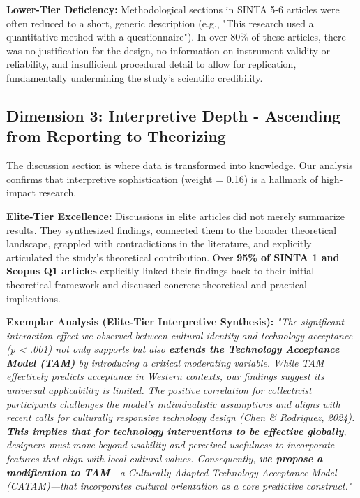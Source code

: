 \documentclass[journal,article,submit,pdftex,moreauthors]{Definitions/mdpi}
\begin{document}
\textbf{Lower-Tier Deficiency:} Methodological sections in SINTA 5-6 articles were often reduced to a short, generic description (e.g., "This research used a quantitative method with a questionnaire"). In over 80\% of these articles, there was no justification for the design, no information on instrument validity or reliability, and insufficient procedural detail to allow for replication, fundamentally undermining the study's scientific credibility.

\subsection{Dimension 3: Interpretive Depth - Ascending from Reporting to Theorizing}

The discussion section is where data is transformed into knowledge. Our analysis confirms that interpretive sophistication (weight = 0.16) is a hallmark of high-impact research.

\textbf{Elite-Tier Excellence:} Discussions in elite articles did not merely summarize results. They synthesized findings, connected them to the broader theoretical landscape, grappled with contradictions in the literature, and explicitly articulated the study's theoretical contribution. Over \textbf{95\% of SINTA 1 and Scopus Q1 articles} explicitly linked their findings back to their initial theoretical framework and discussed concrete theoretical and practical implications.

\textbf{Exemplar Analysis (Elite-Tier Interpretive Synthesis):}
\textit{"The significant interaction effect we observed between cultural identity and technology acceptance (p < .001) not only supports but also \textbf{extends the Technology Acceptance Model (TAM)} by introducing a critical moderating variable. While TAM effectively predicts acceptance in Western contexts, our findings suggest its universal applicability is limited. The positive correlation for collectivist participants challenges the model's individualistic assumptions and aligns with recent calls for culturally responsive technology design (Chen \& Rodriguez, 2024). \textbf{This implies that for technology interventions to be effective globally}, designers must move beyond usability and perceived usefulness to incorporate features that align with local cultural values. Consequently, \textbf{we propose a modification to TAM}—a Culturally Adapted Technology Acceptance Model (CATAM)—that incorporates cultural orientation as a core predictive construct."}
\end{document}
